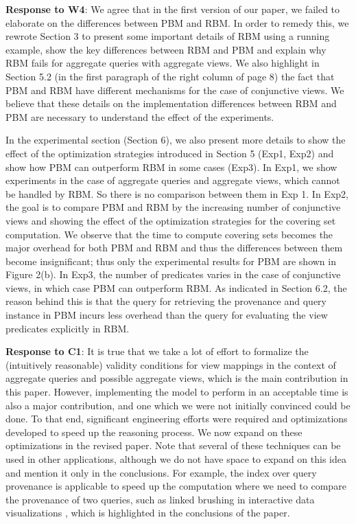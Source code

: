 \begin{appendix}
\textbf{Response to W4}:
We agree that in the first version of our paper, we failed to elaborate on the differences between PBM and RBM. In order to remedy this, we rewrote Section 3 to present some important details of RBM using a running example, show the key differences between RBM and PBM and explain why RBM fails for aggregate queries with aggregate views. We also highlight in Section 5.2 (in the first paragraph of the right column of page 8) the fact that PBM and RBM have different mechanisms for the case of conjunctive views. We believe that these details on the implementation differences between RBM and PBM are necessary to understand the effect of the experiments.

In the experimental section (Section 6), we also present more details to show the effect of the optimization strategies introduced in Section 5 (Exp1, Exp2) and show how PBM can outperform RBM in some cases (Exp3). In Exp1, we show experiments in the case of aggregate queries and aggregate views, which cannot be handled by RBM. So there is no comparison between them in Exp 1. In Exp2, the goal is to compare PBM and RBM by the increasing number of conjunctive views and showing the effect of the optimization strategies for the covering set computation. We observe that the time to compute covering sets becomes the major overhead for both PBM and RBM and thus the differences between them become insignificant; thus only the experimental results for PBM are shown in Figure 2(b). In Exp3, the number of predicates varies in the case of conjunctive views, in which case PBM can outperform RBM. As indicated in Section 6.2, the reason behind this is that the query for retrieving the provenance and query instance in PBM incurs less overhead than the query for evaluating the view predicates explicitly in RBM.

\textbf{Response to C1}:
It is true that we take a lot of effort to formalize the (intuitively reasonable) validity conditions for view mappings in the context of aggregate queries and possible aggregate views, which is the main contribution in this paper. However, implementing the model to perform in an acceptable time is also a major contribution, and one which we were not initially convinced could be done.  To that end, significant engineering efforts were required and optimizations developed to speed up the reasoning process.  We now expand on these optimizations in the revised paper.  Note that several of these techniques can be used in other applications, although we do not have space to expand on this idea and mention it only in the conclusions. For example, the index over query provenance is applicable to speed up the computation where we need to compare the provenance of two queries, such as linked brushing in interactive data visualizations \cite{psallidas2018smoke}, which is highlighted in the conclusions of the paper.


\end{appendix}
